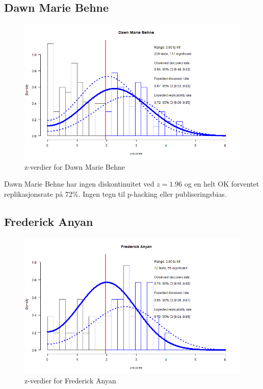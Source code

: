 \documentclass[doc,norsk]{apa7}
\begin{document}
\subsection{Dawn Marie Behne}
\begin{figure}[h!]
    \centering
    \includegraphics[width=\textwidth]{images/Dawn Marie Behne.png}
    \caption{z-verdier for Dawn Marie Behne}
\end{figure}

Dawn Marie Behne har ingen diskontinuitet ved $z=1.96$ og en helt OK forventet replikasjonsrate på 72\%. Ingen tegn til p-hacking eller publiseringsbias.

\subsection{Frederick Anyan}
\begin{figure}[h!]
    \centering
    \includegraphics[width=\textwidth]{images/Frederick Anyan.png}
    \caption{z-verdier for Frederick Anyan}
\end{figure}
\end{document}
